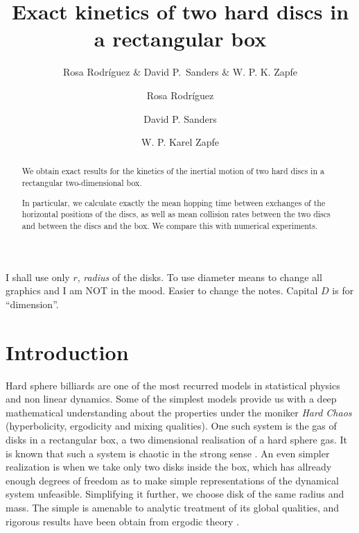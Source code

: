 \documentclass[a4paper,10pt, jcp, aps, preprint]{revtex4-1}
\author{Rosa Rodríguez \& David P.~Sanders \& W. P. K. Zapfe}
\affil{Departamento de Física, Facultad de Ciencias, Universidad Nacional Autónoma de México, Ciudad Universitaria, Del.~Coyoacán, México D.F. 04510, Mexico}
\begin{document}
\title{Exact kinetics of two hard discs in a rectangular box}

\author{Rosa Rodríguez}

\author{David P. Sanders}

\author{W. P. Karel Zapfe}


\begin{abstract}
  We obtain exact results for the kinetics of the inertial motion of 
two hard discs in a rectangular two-dimensional box.

  In particular,  we calculate exactly the mean hopping time between exchanges
 of the horizontal positions of the discs, 
as well as mean collision rates between the two discs and 
 between the discs and the box. We compare this with numerical experiments.
\end{abstract}

\maketitle

I shall use only $r$, \emph{radius} of the disks. To use diameter
means to change all graphics and I am NOT in the mood. Easier to change the notes.
Capital $D$ is for ``dimension''.

\section{Introduction}

Hard sphere billiards are one of the most recurred models in
statistical physics and non linear dynamics.  Some of the simplest models
 provide us with a deep mathematical understanding
about  the properties under the moniker \emph{Hard Chaos} 
(hyperbolicity, ergodicity and mixing qualities). One such system is the
gas of disks in a rectangular box, a two dimensional realisation of a
hard sphere gas. It is known that such a system is chaotic in the
strong sense \cite{Sinai70}. An even simpler realization
is when we take only two disks inside the box, which 
has allready enough degrees of freedom as to make simple representations
of the dynamical system unfeasible. Simplifying it further,
we choose disk of the same radius and mass. The simple
is amenable to analytic treatment of its global qualities,
and rigorous results have been obtain from ergodic theory
\cite{Sinai70, Gallavotti74, SzaszBook00}. 
\end{document}
